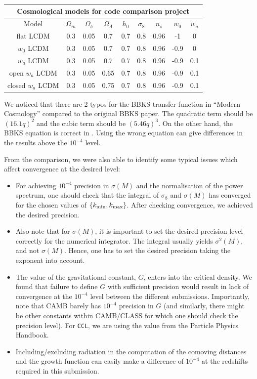 \documentclass[\docopts]{\docclass}
\begin{document}
\begin{center}
  \begin{tabular}{ c | c c c c c c c c }
    \hline
    \multicolumn{9}{|c|}{Cosmological models for code comparison project} \\
    \hline
    \hline
    Model & $\Omega_m$ & $\Omega_b$ & $\Omega_\Lambda$ & $h_0$ & $\sigma_8$ & $n_s$ & $w_0$ & $w_a$ \\
    \hline
    flat LCDM & 0.3 & 0.05 & 0.7 & 0.7 & 0.8 & 0.96 & -1 & 0 \\
    $w_0$ LCDM & 0.3 & 0.05 & 0.7 & 0.7 & 0.8 & 0.96 & -0.9 & 0  \\
    $w_a$ LCDM & 0.3 & 0.05 & 0.7 & 0.7 & 0.8 & 0.96 & -0.9 & 0.1  \\
    open $w_a$ LCDM & 0.3 & 0.05 & 0.65 & 0.7 & 0.8 & 0.96 & -0.9 & 0.1  \\
    closed $w_a$ LCDM & 0.3 & 0.05 & 0.75 & 0.7 & 0.8 & 0.96 & -0.9 & 0.1  \\
    \hline
  \end{tabular}
\end{center}

We noticed that there are 2 typos for the BBKS transfer function in ``Modern Cosmology'' \citep{DodelsonBook} compared to the original BBKS paper. The quadratic term should be $(16.1q)^2$ and the cubic term should be $(5.46q)^3$. On the other hand, the BBKS equation is correct in \citet{PeacockBook}. Using the wrong equation can give differences in the results above the $10^{-4}$ level.

From the comparison, we were also able to identify some typical issues which affect convergence at the desired level:
\begin{itemize}
\item For achieving $10^{-4}$ precision in $\sigma(M)$ and the normalisation of the power spectrum, one should check that the integral of $\sigma_8$ and $\sigma(M)$ has converged for the chosen values of $\{k_{\rm min},k_{\rm max}\}$. After checking convergence, we achieved the desired precision.
\item Also note that for $\sigma(M)$, it is important to set the desired precision level correctly for the numerical integrator. The integral usually yields $\sigma^2(M)$, and not $\sigma(M)$. Hence, one has to set the desired precision taking the exponent into account.
\item The value of the gravitational constant, $G$, enters into the critical density. We found that failure to define $G$ with sufficient precision would result in lack of convergence at the $10^{-4}$ level between the different submissions. Importantly, note that CAMB barely has $10^{-4}$ precision in $G$ (and similarly, there might be other constants within CAMB/CLASS for which one should check the precision level). For {\tt CCL}, we are using the value from the Particle Physics Handbook. %
\item Including/excluding radiation in the computation of the comoving distances and the growth function can easily make a difference of $10^{-4}$ at the redshifts required in this submission.
\end{itemize}
\end{document}
